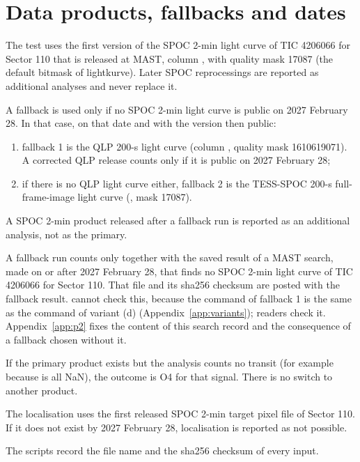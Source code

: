 \section{Data products, fallbacks and dates} \label{app:data}

 The test uses the first version of the SPOC 2-min light curve of TIC 4206066 for Sector
110 that is released at MAST, column , with quality mask 17087 (the default bitmask
 of lightkurve). Later SPOC reprocessings are reported as additional analyses
and never replace it.

 A fallback is used only if no SPOC 2-min light curve is public on 2027 February 28. In
that case, on that date and with the version then public:
\begin{enumerate}
\item fallback 1 is the QLP 200-s light curve (column , quality mask 1610619071). A corrected QLP
  release counts only if it is public on 2027 February 28;
\item if there is no QLP light curve either, fallback 2 is the TESS-SPOC 200-s full-frame-image light curve
  (, mask 17087).
\end{enumerate}
A SPOC 2-min product released after a fallback run is reported as an additional analysis, not as the primary.

A fallback run counts only together with the saved result of a MAST search, made on or after 2027 February 28, that
finds no SPOC 2-min light curve of TIC 4206066 for Sector 110. That file and its sha256 checksum are posted with the
fallback result.  cannot check this, because the command of fallback 1 is the same as the command
of variant (d) (Appendix~\ref{app:variants}); readers check it. Appendix~\ref{app:p2} fixes the content of this search
record and the consequence of a fallback chosen without it.

 If the primary product exists but the analysis counts no transit (for example because
 is all NaN), the outcome is O4 for that signal. There is no switch to another product.

 The localisation uses the first released SPOC 2-min target pixel file of Sector 110. If it does
not exist by 2027 February 28, localisation is reported as not possible.

 The scripts record the file name and the sha256 checksum of every input.
